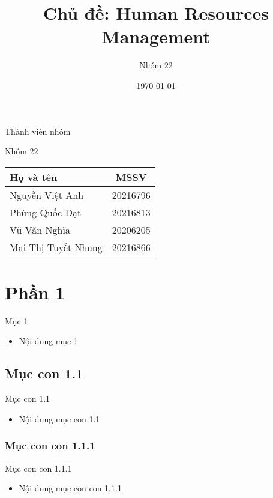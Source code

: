 \documentclass{beamer}
\title[{\makebox[.15\paperwidth]{Human Resources Management}}]{Chủ đề: Human Resources Management}
\author[Nhóm 22]{Nhóm 22}
\date[Data Warehouse \& BI]{\today}
\begin{document}
\begin{frame}
\titlepage
\end{frame}
\begin{frame}{Thành viên nhóm}
\begin{block}{Nhóm 22}
\centering
\begin{tabular} {|l|c|}
\hline
Họ và tên & MSSV \\
\hline
Nguyễn Việt Anh & 20216796 \\
Phùng Quốc Đạt & 20216813 \\
Vũ Văn Nghĩa & 20206205 \\
Mai Thị Tuyết Nhung & 20216866 \\
\hline
\end{tabular}
\end{block}
\end{frame}
 


\section{Phần 1}
\begin{frame}{Mục 1}
    \begin{itemize}
        \item Nội dung mục 1
    \end{itemize}
\end{frame}

\subsection{Mục con 1.1}
\begin{frame}{Mục con 1.1}
    \begin{itemize}
        \item Nội dung mục con 1.1
    \end{itemize}
\end{frame}

\subsubsection{Mục con con 1.1.1}
\begin{frame}{Mục con con 1.1.1}
    \begin{itemize}
        \item Nội dung mục con con 1.1.1
    \end{itemize}
\end{frame}
\end{document}

